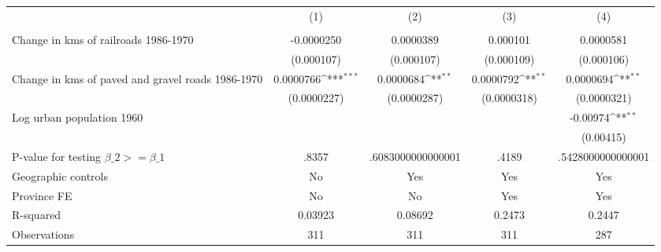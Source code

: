 {
\def\sym#1{\ifmmode^{#1}\else\(^{#1}\)\fi}
\begin{tabular}{l*{4}{c}}
\hline\hline
                &\multicolumn{1}{c}{(1)}&\multicolumn{1}{c}{(2)}&\multicolumn{1}{c}{(3)}&\multicolumn{1}{c}{(4)}\\
                &\multicolumn{1}{c}{}&\multicolumn{1}{c}{}&\multicolumn{1}{c}{}&\multicolumn{1}{c}{}\\
\hline
Change in kms of railroads 1986-1970&-0.0000250         &0.0000389         & 0.000101         &0.0000581         \\
                &(0.000107)         &(0.000107)         &(0.000109)         &(0.000106)         \\
[1em]
Change in kms of paved and gravel roads 1986-1970&0.0000766\sym{***}&0.0000684\sym{**} &0.0000792\sym{**} &0.0000694\sym{**} \\
                &(0.0000227)         &(0.0000287)         &(0.0000318)         &(0.0000321)         \\
[1em]
Log urban population 1960&                  &                  &                  & -0.00974\sym{**} \\
                &                  &                  &                  &(0.00415)         \\
\hline
P-value for testing $\beta\_{2} >= \beta\_{1}$&    .8357         &.6083000000000001         &    .4189         &.5428000000000001         \\
Geographic controls&       No         &      Yes         &      Yes         &      Yes         \\
Province FE     &       No         &       No         &      Yes         &      Yes         \\
R-squared       &  0.03923         &  0.08692         &   0.2473         &   0.2447         \\
Observations    &      311         &      311         &      311         &      287         \\
\hline\hline
\end{tabular}
}
